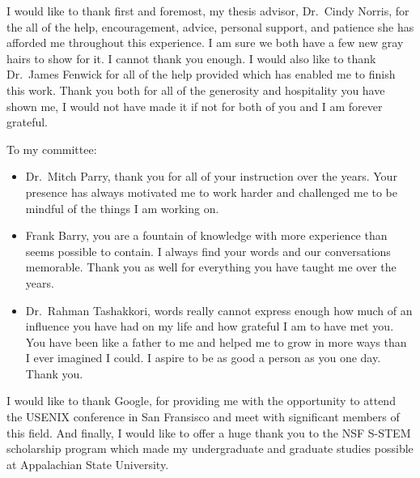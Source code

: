 \acknowledgements{}

I would like to thank first and foremost, my thesis advisor, Dr.~Cindy Norris,
for the all of the help, encouragement, advice, personal support, and patience
she has afforded me throughout this experience. I am sure we both have a few
new gray hairs to show for it. I cannot thank you enough. I would also like to
thank Dr.~James Fenwick for all of the help provided which has enabled me to
finish this work. Thank you both for all of the generosity and hospitality you
have shown me, I would not have made it if not for both of you and I am forever
grateful.

To my committee:
\begin{itemize}
  \item Dr.~Mitch Parry, thank you for all of your instruction over the years.
    Your presence has always motivated me to work harder and challenged me to
    be mindful of the things I am working on.
\item Frank Barry, you are a fountain of knowledge with more experience than
  seems possible to contain. I always find your words and our conversations
  memorable. Thank you as well for everything you have taught me over the
  years.
\item Dr.~Rahman Tashakkori, words really cannot express enough how much of an
  influence you have had on my life and how grateful I am to have met you. You
  have been like a father to me and helped me to grow in more ways than I ever
  imagined I could. I aspire to be as good a person as you one day. Thank you.
\end{itemize}

I would like to thank Google, for providing me with the opportunity to attend
the USENIX conference in San Fransisco and meet with significant members of
this field. And finally, I would like to offer a huge thank you to the NSF
S-STEM scholarship program which made my undergraduate and graduate studies
possible at Appalachian State University.
